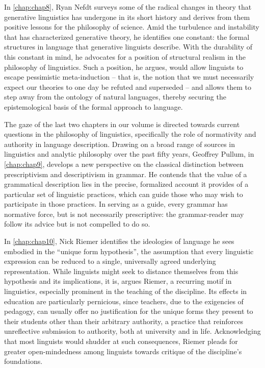 \begin{refsection}
In \ref{chap:chap8}, Ryan Nefdt surveys some of the radical changes in theory that generative linguistics has undergone in its short history and derives from them positive lessons for the philosophy of science. Amid the turbulence and instability that has characterized generative theory, he identifies one constant: the formal structures in language that generative linguists describe. With the durability of this constant in mind, he advocates for a position of structural realism in the philosophy of linguistics. Such a position, he argues, would allow linguists to escape pessimistic meta-induction – that is, the notion that we must necessarily expect our theories to one day be refuted and superseded – and allows them to step away from the ontology of natural languages, thereby securing the epistemological basis of the formal approach to language.

The gaze of the last two chapters in our volume is directed towards current questions in the philosophy of linguistics, specifically the role of normativity and authority in language description. Drawing on a broad range of sources in linguistics and analytic philosophy over the past fifty years, Geoffrey Pullum, in \ref{chap:chap9}, develops a new perspective on the classical distinction between prescriptivism and descriptivism in grammar. He contends that the value of a grammatical description lies in the precise, formalized account it provides of a particular set of linguistic practices, which can guide those who may wish to participate in those practices. In serving as a guide, every grammar has normative force, but is not necessarily prescriptive: the grammar-reader may follow its advice but is not compelled to do so.

In \ref{chap:chap10}, Nick Riemer identifies the ideologies of language he sees embodied in the ``unique form hypothesis'', the assumption that every linguistic expression can be reduced to a single, universally agreed underlying representation. While linguists might seek to distance themselves from this hypothesis and its implications, it is, argues Riemer, a recurring motif in linguistics, especially prominent in the teaching of the discipline. Its effects in education are particularly pernicious, since teachers, due to the exigencies of pedagogy, can usually offer no justification for the unique forms they present to their students other than their arbitrary authority, a practice that reinforces unreflective submission to authority, both at university and in life. Acknowledging that most linguists would shudder at such consequences, Riemer pleads for greater open-mindedness among linguists towards critique of the discipline's foundations.


\end{refsection}
